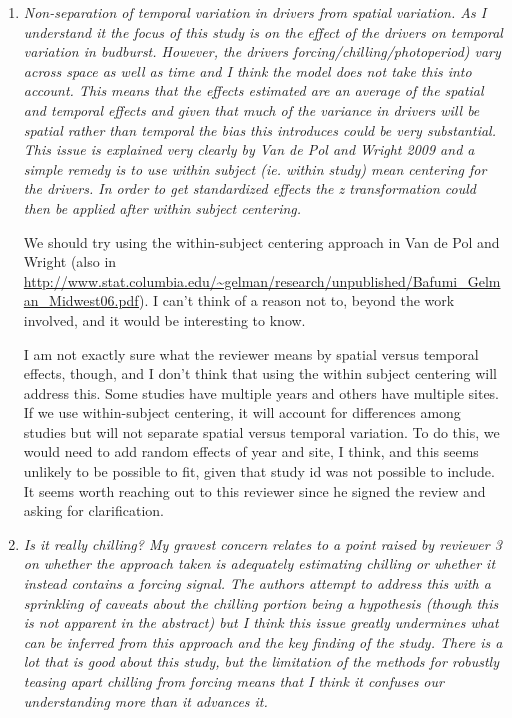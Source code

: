 \documentclass[11pt, a4paper]{article}
\begin{document}
\begin{enumerate}
\item \emph{Non-separation of temporal variation in drivers from spatial variation. As I understand it the
focus of this study is on the effect of the drivers on temporal variation in budburst. However,
the drivers forcing/chilling/photoperiod) vary across space as well as time and I think the
model does not take this into account. This means that the effects estimated are an average of
the spatial and temporal effects and given that much of the variance in drivers will be spatial
rather than temporal the bias this introduces could be very substantial. This issue is explained
very clearly by Van de Pol and Wright 2009 and a simple remedy is to use within subject (ie.
within study) mean centering for the drivers. In order to get standardized effects the z
transformation could then be applied after within subject centering.}
\par We should try using the within-subject centering approach in Van de Pol and Wright (also in \url{http://www.stat.columbia.edu/~gelman/research/unpublished/Bafumi_Gelman_Midwest06.pdf}). I can't think of a reason not to, beyond the work involved, and it would be interesting to know.
\par I am not exactly sure what the reviewer means by spatial versus temporal effects, though, and I don't think that using the within subject centering will address this. Some studies have multiple years and others have multiple sites. If we use within-subject centering, it will account for differences among studies but will not separate spatial versus temporal variation. To do this, we would need to add random effects of year and site, I think, and this seems unlikely to be possible to fit, given that study id was not possible to include. It seems worth reaching out to this reviewer since he signed the review and asking for clarification.
\item \emph{ Is it really chilling? My gravest concern relates to a point raised by reviewer 3 on whether the
approach taken is adequately estimating chilling or whether it instead contains a forcing signal.
The authors attempt to address this with a sprinkling of caveats about the chilling portion
being a hypothesis (though this is not apparent in the abstract) but I think this issue greatly
undermines what can be inferred from this approach and the key finding of the study. There is
a lot that is good about this study, but the limitation of the methods for robustly teasing apart
chilling from forcing means that I think it confuses our understanding more than it advances it.}

\end{enumerate}
\end{document}
